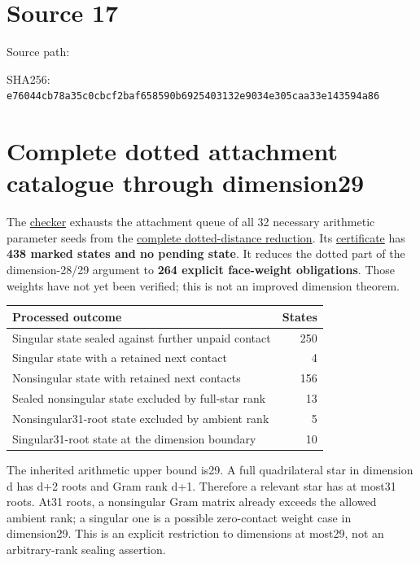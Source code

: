 \documentclass[
  10pt,
]{report}
\newcounter{none} %
\begin{document}
\clearpage

\chapter{Source 17}\label{source-17}

Source path:

SHA256:
\nolinkurl{e76044cb78a35c0cbcf2baf658590b6925403132e9034e305caa33e143594a86}

\chapter{Complete dotted attachment catalogue through
dimension29}\label{complete-dotted-attachment-catalogue-through-dimension29}

The
\href{../scripts/fresh_sqrt5_dotted_rank29_exhaustion_20261015.py}{checker}
exhausts the attachment queue of all 32 necessary arithmetic parameter
seeds from the \href{fresh_sqrt5_dotted_parameters_20261015.md}{complete
dotted-distance reduction}. Its
\href{fresh_sqrt5_dotted_rank29_exhaustion_20261015.json}{certificate}
has \textbf{438 marked states and no pending state}. It reduces the
dotted part of the dimension-28/29 argument to \textbf{264 explicit
face-weight obligations}. Those weights have not yet been verified; this
is not an improved dimension theorem.

{\def\LTcaptype{none} %
\begin{longtable}[]{@{}lr@{}}
\toprule\noalign{}
Processed outcome & States \\
\midrule\noalign{}
\endhead
\bottomrule\noalign{}
\endlastfoot
Singular state sealed against further unpaid contact & 250 \\
Singular state with a retained next contact & 4 \\
Nonsingular state with retained next contacts & 156 \\
Sealed nonsingular state excluded by full-star rank & 13 \\
Nonsingular31-root state excluded by ambient rank & 5 \\
Singular31-root state at the dimension boundary & 10 \\
\end{longtable}
}

The inherited arithmetic upper bound is29. A full quadrilateral star in
dimension d has d+2 roots and Gram rank d+1. Therefore a relevant star
has at most31 roots. At31 roots, a nonsingular Gram matrix already
exceeds the allowed ambient rank; a singular one is a possible
zero-contact weight case in dimension29. This is an explicit restriction
to dimensions at most29, not an arbitrary-rank sealing assertion.
\end{document}
